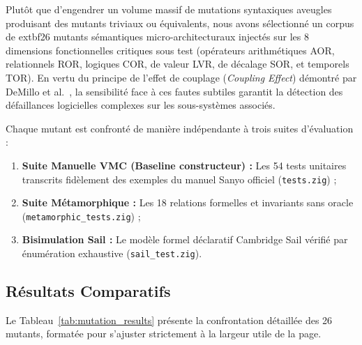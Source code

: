 \documentclass[10pt,journal,compsoc]{IEEEtran}
\begin{document}
Plutôt que d'engendrer un volume massif de mutations syntaxiques aveugles produisant des mutants triviaux ou équivalents, nous avons sélectionné un corpus de 	extbf{26 mutants sémantiques micro-architecturaux} injectés sur les 8 dimensions fonctionnelles critiques sous test (opérateurs arithmétiques AOR, relationnels ROR, logiques COR, de valeur LVR, de décalage SOR, et temporels TOR). En vertu du principe de l'effet de couplage (\textit{Coupling Effect}) démontré par DeMillo et al.~\cite{demillo1978}, la sensibilité face à ces fautes subtiles garantit la détection des défaillances logicielles complexes sur les sous-systèmes associés.

Chaque mutant est confronté de manière indépendante à trois suites d'évaluation :
\begin{enumerate}
    \item \textbf{Suite Manuelle VMC (Baseline constructeur) :} Les 54 tests unitaires transcrits fidèlement des exemples du manuel Sanyo officiel (\texttt{tests.zig}) ;
    \item \textbf{Suite Métamorphique :} Les 18 relations formelles et invariants sans oracle (\texttt{metamorphic\_tests.zig}) ;
    \item \textbf{Bisimulation Sail :} Le modèle formel déclaratif Cambridge Sail vérifié par énumération exhaustive (\texttt{sail\_test.zig}).
\end{enumerate}

\subsection{Résultats Comparatifs}
Le Tableau~\ref{tab:mutation_results} présente la confrontation détaillée des 26 mutants, formatée pour s'ajuster strictement à la largeur utile de la page.
\end{document}
